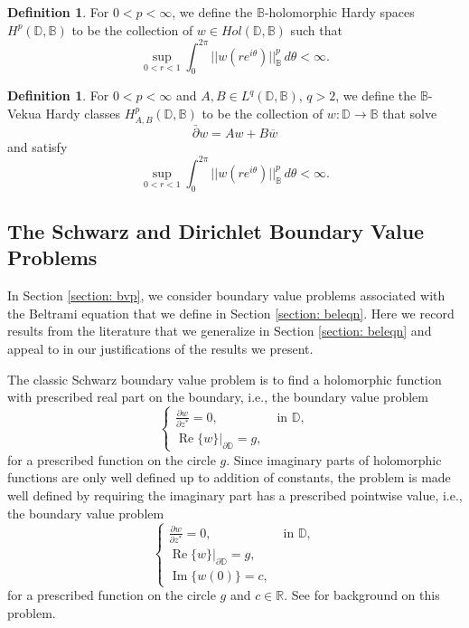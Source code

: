 \documentclass[12pt,reqno]{amsart}
\theoremstyle{definition}
\newtheorem{deff}[theorem]{Definition}
\theoremstyle{remark}
\newcommand{\R}{\mathbb R}
\newcommand{\p}{\partial}
\newcommand{\dbar}{\bar\partial}
\DeclareMathOperator{\im}{Im}
\DeclareMathOperator{\re}{Re}
\newcommand{\bc}{\mathbb{B}}
\newcommand{\disk}{\mathbb{D}}
\begin{document}
        \begin{deff}\label{deff: bcholohardy}
            For $0 < p < \infty$, we define the $\bc$-holomorphic Hardy spaces $H^p(\disk,\bc)$ to be the collection of $w \in Hol(\disk,\bc)$ such that 
            \[
                \sup_{0 < r < 1} \int_0^{2\pi} ||w(re^{i\theta})||_{\bc}^p \,d\theta < \infty.
            \]
        \end{deff}

        \begin{deff}\label{deff: bcvekhardy}
            For $0 < p < \infty$ and $A, B \in L^q(\disk,\bc)$, $q>2$, we define the $\bc$-Vekua Hardy classes $H^p_{A,B}(\disk,\bc)$ to be the collection of $w: \disk \to\bc$ that solve
            \[
                \dbar w = Aw + B\overline{w}
            \]
            and satisfy
            \[
                \sup_{0 < r < 1} \int_0^{2\pi} ||w(re^{i\theta})||_{\bc}^p \,d\theta < \infty.
            \]
        \end{deff}

   

     \subsection{The Schwarz and Dirichlet Boundary Value Problems}

     

    In Section \ref{section: bvp}, we consider boundary value problems associated with the Beltrami equation that we define in Section \ref{section: beleqn}. Here we record results from the literature that we generalize in Section \ref{section: beleqn} and appeal to in our justifications of the results we present. 

    The classic Schwarz boundary value problem is to find a holomorphic function with prescribed real part on the boundary, i.e., the boundary value problem 
    \[
        \begin{cases}
            \frac{\p w}{\p z^*} = 0, & \text{ in } \disk,\\
            \re\{w\}|_{\p \disk} = g,
        \end{cases}
    \]
    for a prescribed function on the circle $g$. Since imaginary parts of holomorphic functions are only well defined up to addition of constants, the problem is made well defined by requiring the imaginary part has a prescribed pointwise value, i.e., the boundary value problem 
    \[
        \begin{cases}
            \frac{\p w}{\p z^*} = 0, & \text{ in } \disk,\\
            \re\{w\}|_{\p \disk} = g,\\
            \im\{w(0)\} = c,
        \end{cases}
    \]
    for a prescribed function on the circle $g$ and $c \in \R$. See \cite{BegBook,Beg} for background on this problem. 
    
\end{document}
